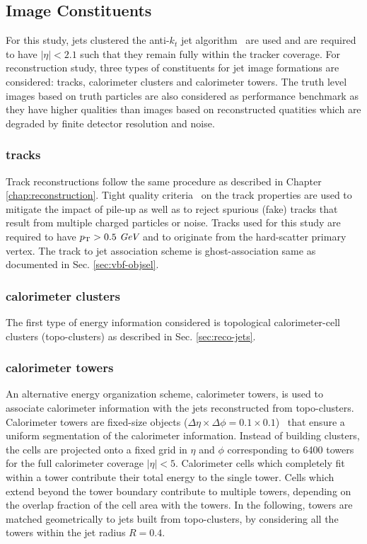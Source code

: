 \label{sec:cnn-image}
\subsection{Image Constituents}
For this study, jets clustered the anti-$k_t$ jet algorithm~\cite{Cacciari:2008gp}
are used and are required to have $|\eta|<2.1$ such that they remain fully within the
tracker coverage.
For reconstruction study, three types of constituents for jet image formations
are considered: tracks, calorimeter clusters and calorimeter towers. The truth level images
based on truth particles are also considered as performance benchmark as they have
higher qualities than images based on reconstructed quatities which are degraded by
finite detector resolution and noise. 

\subsubsection{tracks}
Track reconstructions follow the same procedure as described in Chapter \ref{chap:reconstruction}. Tight quality
criteria~\cite{ATL-PHYS-PUB-2015-051} on the track properties are used to mitigate the impact of pile-up as well as
to reject spurious (fake) tracks that result from multiple charged particles or noise.
Tracks used for this study are required to have $p_\text{T} > 0.5~\textit{GeV}$ and to originate from the hard-scatter primary vertex. 
The track to jet association scheme is ghost-association same as documented in Sec. \ref{sec:vbf-objsel}.


\subsubsection{calorimeter clusters}
The first type of energy information considered is topological calorimeter-cell 
clusters (topo-clusters) as described in Sec. \ref{sec:reco-jets}.


\subsubsection{calorimeter towers}
An alternative energy organization scheme, calorimeter towers,
is used to associate calorimeter information with the jets
reconstructed from topo-clusters.
Calorimeter towers are fixed-size objects ($\Delta\eta\times\Delta\phi=0.1\times0.1$)~\cite{cscbook}
that ensure a uniform segmentation of the calorimeter information.
Instead of building clusters, the cells are projected onto a fixed grid in $\eta$ and $\phi$ corresponding to 6400 towers
for the full calorimeter coverage $|\eta|<5$.
Calorimeter cells which completely fit within a tower contribute their total energy
to the single tower.
Cells which extend beyond the tower boundary contribute to multiple
towers, depending on the overlap fraction of the cell area with the towers.
In the following, towers are matched geometrically to jets built from topo-clusters, by considering all the towers within
the jet radius $R=0.4$.

